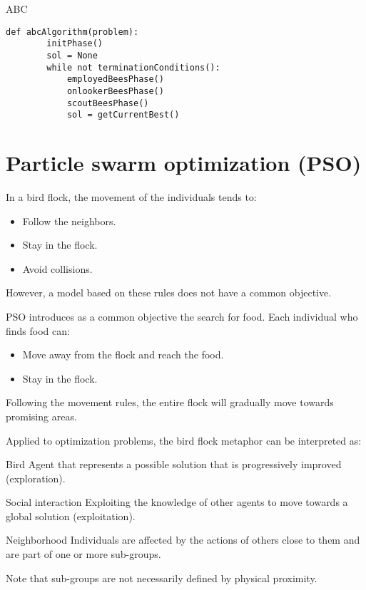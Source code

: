 \begin{algorithm}
\caption{ABC}
\begin{lstlisting}[mathescape=true]
    def abcAlgorithm(problem):
        initPhase()
        sol = None
        while not terminationConditions():
            employedBeesPhase()
            onlookerBeesPhase()
            scoutBeesPhase()
            sol = getCurrentBest()
\end{lstlisting}
\end{algorithm}



\section{Particle swarm optimization (PSO)}

In a bird flock, the movement of the individuals tends to:
\begin{itemize}
    \item Follow the neighbors.
    \item Stay in the flock.
    \item Avoid collisions.
\end{itemize}
However, a model based on these rules does not have a common objective.

PSO introduces as a common objective the search for food.
Each individual who finds food can:
\begin{itemize}
    \item Move away from the flock and reach the food.
    \item Stay in the flock.
\end{itemize}
Following the movement rules, the entire flock will gradually move towards promising areas.

Applied to optimization problems, the bird flock metaphor can be interpreted as:
\begin{descriptionlist}
    \item[Bird] 
        Agent that represents a possible solution that is progressively improved (exploration).

    \item[Social interaction] 
        Exploiting the knowledge of other agents to move towards a global solution (exploitation).

    \item[Neighborhood]
        Individuals are affected by the actions of others close to them and are part of one or more sub-groups.

        Note that sub-groups are not necessarily defined by physical proximity.
\end{descriptionlist}

